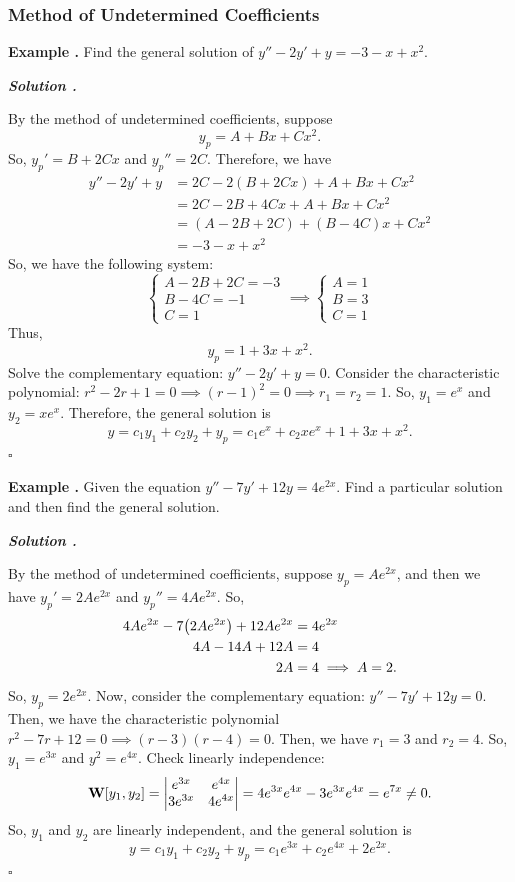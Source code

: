 \documentclass[12pt, a4paper]{article}
\newcounter{index}[subsection]
\newenvironment*{eg}{\begin{framed}\par\noindent\textbf{Example \thesubsection.\stepcounter{index}\theindex}}{\par\end{framed}}
\newcounter{nprf}[subsection]
\newenvironment*{sol}{\par\indent\textbf{\textit{Solution \stepcounter{nprf}\thenprf.}}\par}{\hfill{$\square$}\par}
\def\C{{\mathbb{C}}}
\def\W{\vb W}
\begin{document}
\subsubsection{Method of Undetermined Coefficients}
\begin{eg}
	Find the general solution of $y''-2y'+y=-3-x+x^2$. 
	\begin{sol}
		By the method of undetermined coefficients, suppose \[y_p=A+Bx+Cx^2.\] So, $y_p'=B+2Cx$ and $y_p''=2C$. Therefore, we have \begin{align*}y''-2y'+y&=2C-2(B+2Cx)+A+Bx+Cx^2\\&=2C-2B+4Cx+A+Bx+Cx^2\\&=(A-2B+2C)+(B-4C)x+Cx^2\\&=-3-x+x^2\end{align*} So, we have the following system: \[\begin{cases}A-2B+2C=-3\\B-4C=-1\\C=1\end{cases}\implies\begin{cases}A=1\\B=3\\C=1\end{cases}\] Thus, \[y_p=1+3x+x^2.\] Solve the complementary equation: $y''-2y'+y=0$. Consider the characteristic polynomial: $r^2-2r+1=0\implies(r-1)^2=0\implies r_1=r_2=1$. So, $y_1=e^x$ and $y_2=xe^x$. Therefore, the general solution is \[y=c_1y_1+c_2y_2+y_p=c_1e^x+c_2xe^x+1+3x+x^2.\]
	\end{sol}
\end{eg}
\begin{eg}
	Given the equation $y''-7y'+12y=4e^{2x}$. Find a particular solution and then find the general solution. 
	\begin{sol}
		By the method of undetermined coefficients, suppose $y_p=Ae^{2x}$, and then we have $y_p'=2Ae^{2x}$ and $y_p''=4Ae^{2x}$. So, \begin{align*}4Ae^{2x}-7\qty(2Ae^{2x})+12Ae^{2x}&=4e^{2x}\\4A-14A+12A&=4\\2A&=4\implies A=2.\end{align*} So, $y_p=2e^{2x}$. Now, consider the complementary equation: $y''-7y'+12y=0$. Then, we have the characteristic polynomial $r^2-7r+12=0\implies(r-3)(r-4)=0$. Then, we have $r_1=3$ and $r_2=4$. So, $y_1=e^{3x}$ and $y^2=e^{4x}$. Check linearly independence: \[\W\qty[y_1,y_2]=\mqty|e^{3x}&e^{4x}\\3e^{3x}&4e^{4x}|=4e^{3x}e^{4x}-3e^{3x}e^{4x}=e^{7x}\neq0.\] So, $y_1$ and $y_2$ are linearly independent, and the general solution is \[y=c_1y_1+c_2y_2+y_p=c_1e^{3x}+c_2e^{4x}+2e^{2x}.\]
	\end{sol}
\end{eg}
\end{document}
